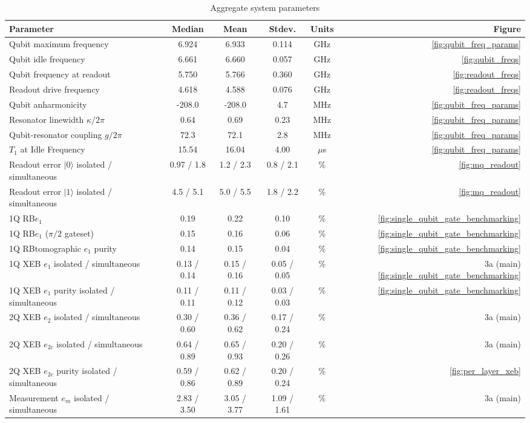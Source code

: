 \begin{table}[htbp]
\caption{\label{tab:system_params} Aggregate system parameters}
\begin{ruledtabular}
\begin{tabular}{lccccr}
Parameter & Median & Mean & Stdev. & Units & Figure\\
\hline
Qubit maximum frequency & 6.924 & 6.933 & 0.114 & GHz & \ref{fig:qubit_freq_params}\\
Qubit idle frequency    & 6.661 & 6.660 & 0.057 & GHz & \ref{fig:qubit_freqs} \\
Qubit frequency at readout & 5.750 & 5.766 & 0.360 & GHz & \ref{fig:readout_freqs} \\
Readout drive frequency & 4.618 & 4.588 & 0.076 & GHz & \ref{fig:readout_freqs}\\
Qubit anharmonicity & -208.0 & -208.0 &  4.7 &  MHz & \ref{fig:qubit_freq_params}\\
Resonator linewidth $\kappa/2\pi$ & 0.64 & 0.69 & 0.23 & MHz & \ref{fig:qubit_freq_params} \\
Qubit-resonator coupling $g/2\pi$ & 72.3 & 72.1 &  2.8 & MHz & \ref{fig:qubit_freq_params}\\
$T_1$ at Idle Frequency & 15.54 & 16.04 & 4.00 & $\mu$s & \ref{fig:qubit_freq_params}\\
Readout error $|0\rangle$ isolated / simultaneous & 0.97 / 1.8 & 1.2 / 2.3 & 0.8 / 2.1 & \% & \ref{fig:mq_readout}\\
Readout error $|1\rangle$ isolated / simultaneous & 4.5 / 5.1 & 5.0 / 5.5 & 1.8 / 2.2 & \% & \ref{fig:mq_readout}\\
1Q RB\footnotemark[1] $e_1$ & 0.19 & 0.22 & 0.10 & \% & \ref{fig:single_qubit_gate_benchmarking}\\
1Q RB\footnotemark[1]  $e_1$ ($\pi/2$ gateset)& 0.15 & 0.16 & 0.06 & \% & \ref{fig:single_qubit_gate_benchmarking}\\
1Q RB\footnotemark[1] tomographic $e_1$ purity & 0.14 & 0.15 & 0.04 & \% & \ref{fig:single_qubit_gate_benchmarking}\\
1Q XEB $e_1$ isolated / simultaneous & 0.13 / 0.14 & 0.15 / 0.16 & 0.05 / 0.05 & \% & 3a (main) \ref{fig:single_qubit_gate_benchmarking}\\
1Q XEB $e_1$ purity isolated / simultaneous & 0.11 / 0.11 & 0.11 / 0.12 &  0.03 / 0.03 & \% & \ref{fig:single_qubit_gate_benchmarking}\\
2Q XEB $e_2$ isolated / simultaneous & 0.30 / 0.60 & 0.36 / 0.62 & 0.17 / 0.24 & \% & 3a (main) \\
2Q XEB $e_{2c}$ isolated / simultaneous & 0.64 / 0.89 & 0.65 / 0.93 & 0.20 / 0.26 & \% & 3a (main) \\ 
2Q XEB $e_{2c}$ purity isolated / simultaneous & 0.59 / 0.86 & 0.62 / 0.89 & 0.20 / 0.24 & \% & \ref{fig:per_layer_xeb}\\ 
Measurement $e_m$ isolated /  simultaneous & 2.83 / 3.50 & 3.05 / 3.77 & 1.09 / 1.61 & \% & 3a (main) \\

\end{tabular}
\end{ruledtabular}
\end{table}


